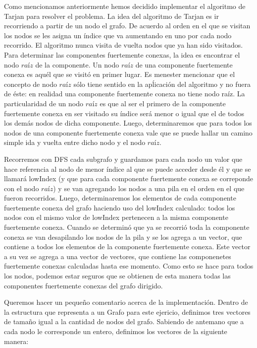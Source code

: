 \quad Como mencionamos anteriormente hemos decidido implementar el algoritmo de Tarjan para resolver el problema. La idea del algoritmo de Tarjan es ir recorriendo a partir de un nodo el grafo. De acuerdo al orden en el que se visitan los nodos se les asigna un índice que va aumentando en uno por cada nodo recorrido. El algoritmo nunca visita de vuelta nodos que ya han sido visitados. Para determinar las componentes fuertemente conexas, la idea es encontrar el nodo $raíz$ de la componente. Un nodo $raíz$ de una componente fuertemente conexa es aquél que se visitó en primer lugar. Es menester mencionar que el concepto de nodo $raíz$ sólo tiene sentido en la apĺicación del algoritmo y no fuera de éste: en realidad una componente fuertemente conexa no tiene nodo raíz. La particularidad de un nodo $raíz$ es que al ser el primero de la componente fuertemente conexa en ser visitado su índice será menor o igual que el de todos los demás nodos de dicha componente. Luego, determinaremos que para todos los nodos de una componente fuertemente conexa vale que se puede hallar un camino simple ida y vuelta entre dicho nodo y el nodo $raíz$. 

\quad Recorremos con DFS cada subgrafo y guardamos para cada nodo un valor que hace referencia al nodo de menor índice al que se puede acceder desde él y que se llamará lowIndex (y que para cada componente fuertemente conexa se correponde con el nodo $raíz$) y se van  agregando los nodos a una pila en el orden en el que fueron recorridos. Luego, determinaremos los elementos de cada componente fuertemente conexa del grafo haciendo uso del lowIndex calculado: todos los nodos con el mismo valor de lowIndex pertenecen a la misma componente fuertemente conexa. Cuando se determinó que ya se recorrió toda la componente conexa se van desapilando los nodos de la pila y se los agrega a un vector, que contiene a todos los elementos de la componente fuertemente conexa. Este vector a su vez se agrega a una vector de vectores, que contiene las componenetes fuertemente conexas calculadas hasta ese momento.  Como esto se hace para todos los nodos, podemos estar seguros que se obtienen de esta manera todas las componentes fuertemente conexas del grafo dirigido.

\quad Queremos hacer un pequeño comentario acerca de la implementación. Dentro de la estructura que representa a un Grafo para este ejericio, definimos tres vectores de tamaño igual a la cantidad de nodos del grafo. Sabiendo de antemano que a cada nodo le corresponde un entero, definimos los vectores de la siguiente manera:

